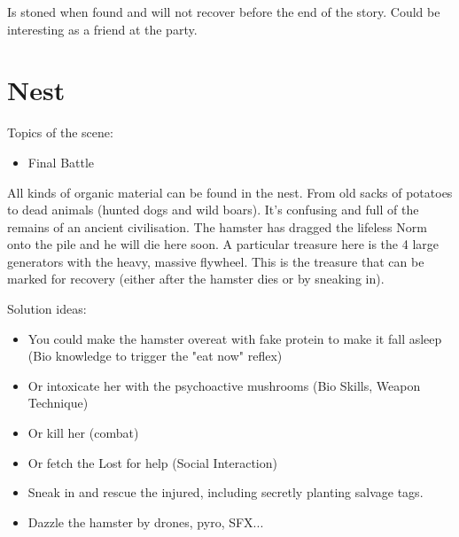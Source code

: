 \begin{npcBox}[title=Lucien\, Director]
    \begin{stressSection}
    \end{stressSection}
    \begin{tabularx}{\textwidth}{ XX }
    \end{tabularx}

    \begin{consequences}
    \item {}
    \item {}
    \item {}
    \end{consequences}

    \begin{npcDescription}
    Is stoned when found and will not recover before the end of the story. Could be interesting as a friend at the party.
    \end{npcDescription}

\end{npcBox}

\section{Nest}

Topics of the scene:
\begin{itemize}
\item Final Battle
\end{itemize}

All kinds of organic material can be found in the nest. From old sacks of potatoes to dead animals (hunted dogs and wild boars).
It's confusing and full of the remains of an ancient civilisation.
The hamster has dragged the lifeless Norm onto the pile and he will die here soon.
A particular treasure here is the 4 large generators with the heavy, massive flywheel. This is the treasure that can be marked for recovery (either after the hamster dies or by sneaking in).

Solution ideas:
\begin{itemize}
\item You could make the hamster overeat with fake protein to make it fall asleep (Bio knowledge to trigger the "eat now" reflex)
\item Or intoxicate her with the psychoactive mushrooms (Bio Skills, Weapon Technique)
\item Or kill her (combat)
\item Or fetch the Lost for help (Social Interaction)
\item Sneak in and rescue the injured, including secretly planting salvage tags.
\item Dazzle the hamster by drones, pyro, SFX...
\end{itemize}



